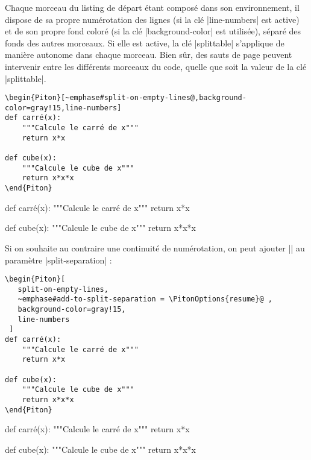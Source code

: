 \documentclass[dvipsnames,svgnames]{article}
\begin{document}
\smallskip
Chaque morceau du listing de départ étant composé dans son environnement, il dispose de sa
propre numérotation des lignes (si la clé |line-numbers| est active) et de son propre fond
coloré (si la clé |background-color| est utilisée), séparé des fonds des autres morceaux.
Si elle est active, la clé |splittable| s'applique de manière autonome dans chaque
morceau. Bien sûr, des sauts de page peuvent intervenir entre les différents morceaux du
code, quelle que soit la valeur de la clé |splittable|.

\bigskip
\begin{Verbatim}
\begin{Piton}[~emphase#split-on-empty-lines@,background-color=gray!15,line-numbers]
def carré(x):
    """Calcule le carré de x"""
    return x*x

def cube(x):
    """Calcule le cube de x"""
    return x*x*x
\end{Piton}
\end{Verbatim}


\begin{Piton}[split-on-empty-lines,background-color=gray!15,line-numbers]
def carré(x):
    """Calcule le carré de x"""
    return x*x

def cube(x):
    """Calcule le cube de x"""
    return x*x*x
\end{Piton}


\vspace{5mm}
Si on souhaite au contraire une continuité de numérotation, on peut ajouter
|| au paramètre |split-separation| :

\bigskip
\begin{Verbatim}
\begin{Piton}[
   split-on-empty-lines,
   ~emphase#add-to-split-separation = \PitonOptions{resume}@ ,
   background-color=gray!15,
   line-numbers
 ]
def carré(x):
    """Calcule le carré de x"""
    return x*x

def cube(x):
    """Calcule le cube de x"""
    return x*x*x
\end{Piton}
\end{Verbatim}

\begin{Piton}[
   split-on-empty-lines,
   add-to-split-separation = \PitonOptions{resume} ,
   background-color=gray!15,
   line-numbers
 ]
def carré(x):
    """Calcule le carré de x"""
    return x*x

def cube(x):
    """Calcule le cube de x"""
    return x*x*x
\end{Piton}
\end{document}
